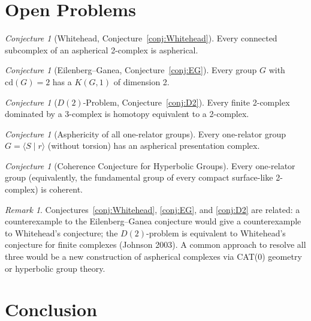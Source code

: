 \documentclass[12pt,a4paper]{amsart}
\theoremstyle{definition}
\theoremstyle{remark}
\newtheorem{remark}[theorem]{Remark}
\newtheorem{conjecture}[theorem]{Conjecture}
\begin{document}
\section{Open Problems}

\begin{conjecture}[Whitehead, Conjecture~\ref{conj:Whitehead}]
Every connected subcomplex of an aspherical 2-complex is aspherical.
\end{conjecture}

\begin{conjecture}[Eilenberg--Ganea, Conjecture~\ref{conj:EG}]
Every group $G$ with $\mathrm{cd}(G) = 2$ has a $K(G,1)$ of dimension 2.
\end{conjecture}

\begin{conjecture}[$D(2)$-Problem, Conjecture~\ref{conj:D2}]
Every finite 2-complex dominated by a 3-complex is homotopy equivalent
to a 2-complex.
\end{conjecture}

\begin{conjecture}[Asphericity of all one-relator groups]
\label{conj:one-relator-asph}
Every one-relator group $G = \langle S \mid r \rangle$ (without torsion)
has an aspherical presentation complex.
\end{conjecture}

\begin{conjecture}[Coherence Conjecture for Hyperbolic Groups]
Every one-relator group (equivalently, the fundamental group of every
compact surface-like 2-complex) is coherent.
\end{conjecture}

\begin{remark}
Conjectures~\ref{conj:Whitehead}, \ref{conj:EG}, and \ref{conj:D2} are
related: a counterexample to the Eilenberg--Ganea conjecture would give
a counterexample to Whitehead's conjecture; the $D(2)$-problem is equivalent
to Whitehead's conjecture for finite complexes (Johnson 2003).
A common approach to resolve all three would be a new construction of
aspherical complexes via CAT(0) geometry or hyperbolic group theory.
\end{remark}

\section{Conclusion}
\end{document}

